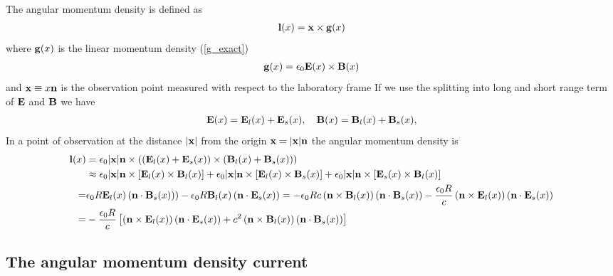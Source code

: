 The angular momentum density is defined as
\begin{align}
    {\bf l}(x)={\bf x}\times {\bf g}(x)
\end{align}
where ${\bf g}(x)$ is the linear momentum density (\ref{g_exact})
\begin{align}
    {\bf g}(x)=\epsilon_0{\bf E}(x)\times{\bf B}(x)
\end{align}
and ${\bf x} \equiv x{\bf n}$ is the observation point measured with respect to the laboratory frame
If we use the splitting into long and short range term of ${\bf E}$ and ${\bf B}$ we have
\begin{align}
    {\bf E}(x)={\bf E}_l(x)+{\bf E}_s(x),\quad   {\bf B}(x)={\bf B}_l(x)+{\bf B}_s(x),
\end{align}
In a point of observation at the distance $|{\bf x}|$ from the origin ${\bf x}=|{\bf x}|{\bf n}$ the angular momentum density is
\begin{align}
    {\bf l}(x) & =  \epsilon_0|{\bf x}|{\bf n}\times\left(\left({\bf E}_l(x)+{\bf E}_s(x)\right)\times\left({\bf B}_l(x)+{\bf B}_s(x)\right)\right)\nonumber                                                                                                         \\
               & \approx\epsilon_0|{\bf x}|{\bf n}\times\left[{\bf E}_l(x)\times{\bf B}_l(x)\right]+\epsilon_0|{\bf x}|{\bf n}\times\left[{\bf E}_l(x)\times{\bf B}_s(x)\right]+\epsilon_0|{\bf x}|{\bf n}\times\left[{\bf E}_s(x)\times{\bf B}_l(x)\right]\nonumber        \\
    =          & \epsilon_0R{\bf E}_l(x) \left({\bf n}\cdot{\bf B}_s(x))\right)-\epsilon_0R{\bf B}_l(x) \left({\bf n}\cdot{\bf E}_s(x)\right)=-\epsilon_0 Rc\left({\bf n}\times{\bf B}_l(x)\right)\left({\bf n}\cdot{\bf B}_s(x)\right)-\frac{\epsilon_0R}{c}\left({\bf n}\times{\bf E}_l(x)\right)\left({\bf n}\cdot{\bf E}_s(x)\right)\nonumber \\
    =          & -\frac{\epsilon_0R}c\left[\left({\bf n}\times{\bf E}_l(x)\right)\left({\bf n}\cdot{\bf E}_s(x)\right)+c^2\left({\bf n}\times{\bf B}_l(x)\right)\left({\bf n}\cdot{\bf B}_s(x)\right)\right]
\end{align}




\subsection{The angular momentum density current}

